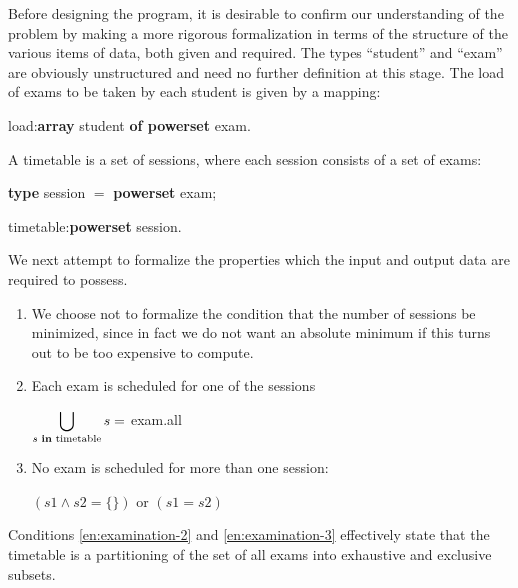 Before designing the program, it is desirable to confirm our understanding of the problem by making a more rigorous formalization in terms of the structure of the various items of data, both given and required. The types ``student'' and ``exam'' are obviously unstructured and need no further definition at this stage. The load of exams to be taken by each student is given by a mapping:

\quad load:\textbf{array} student \textbf{of powerset} exam.

\noindent
A timetable is a set of sessions, where each session consists of a set of exams:

\quad \textbf{type} session $=$ \textbf{powerset} exam;

\quad timetable:\textbf{powerset} session.

\noindent
We next attempt to formalize the properties which the input and output data are required to possess.

\begin{enumerate}[leftmargin=2\parindent, label=(\arabic*)]
	\item \label{en:examination-1}
	We choose not to formalize the condition that the number of sessions be minimized, since in fact we do not want an absolute minimum if this turns out to be too expensive to compute.

	\item \label{en:examination-2}
	Each exam is scheduled for one of the sessions

	$\displaystyle\bigcup_{s\text{ \textbf{in} timetable}} s =$ exam.all

	\item \label{en:examination-3}
	No exam is scheduled for more than one session:

	\quad $(s1 \wedge s2 = \{\})$ or $(s1 = s2)$
\end{enumerate}

\noindent
Conditions \ref{en:examination-2} and \ref{en:examination-3} effectively state that the timetable is a partitioning of the set of all exams into exhaustive and exclusive subsets.

